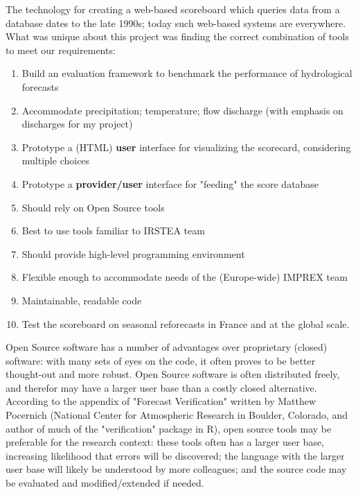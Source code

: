 \documentclass[logos,parttoc,morelanguage=french,morelanguage=german]{orsay-memoire}
\begin{document}
The technology for creating a web-based scoreboard which queries data from a database dates to the late 1990s; today such web-based systems are everywhere. What was unique about this project was finding the correct combination of tools to meet our requirements:
\begin{enumerate}
	\item Build an evaluation framework to benchmark the performance of hydrological forecasts
    \item Accommodate precipitation; temperature; flow discharge (with emphasis on discharges for my project)
    \item Prototype a (HTML) \textbf{user} interface for visualizing the scorecard, considering multiple choices
   	\item Prototype a \textbf{provider/user} interface for "feeding" the score database
	\item Should rely on Open Source tools
    \item Best to use tools familiar to IRSTEA team
    \item Should provide high-level programming environment
    \item Flexible enough to accommodate needs of the  (Europe-wide) IMPREX team
    \item Maintainable, readable code
    \item Test the scoreboard on seasonal reforecasts in France and at the global scale.
\end{enumerate}

Open Source software has a number of advantages over proprietary (closed) software: with many sets of eyes on the code, it often proves to be better thought-out and more robust. Open Source software is often distributed freely, and therefor may have a larger user base than a costly closed alternative. According to the appendix of "Forecast Verification" \autocite{JolliffeIanT.andStephenson2012ForecastVerification} written by Matthew Pocernich (National Center for Atmospheric Research in Boulder, Colorado, and author of much of the "verification" package in R), open source tools may be preferable for the research context: these tools often has a larger user base, increasing likelihood that errors will be discovered; the language with the larger user base  will likely be understood by more colleagues; and the source code may be evaluated and modified/extended if needed.
%
%
\end{document}
